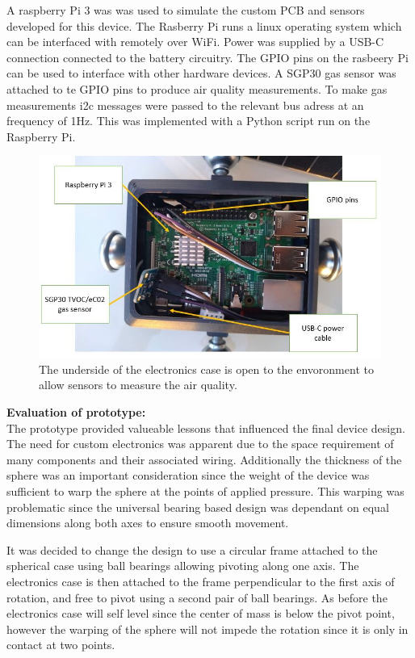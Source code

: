 A raspberry Pi 3 was was used to simulate the custom PCB and sensors developed for this device. The Rasberry Pi runs a linux operating system which can be interfaced with remotely over WiFi. Power was supplied by a USB-C connection connected to the battery circuitry. The GPIO pins on the rasbeery Pi can be used to interface with other hardware devices. A SGP30 gas sensor was attached to te GPIO pins to produce air quality measurements. To make gas measurements i2c messages were passed to the relevant bus adress at an frequency of 1Hz. This was implemented with a Python script run on the Raspberry Pi.

\begin{figure}[H]
\centering
\includegraphics[width=0.5\linewidth]{Engineering_hardware/Engineering_hardware_Figures/prototype_pic_2.JPG}
\caption{The underside of the electronics case is open to the envoronment to allow sensors to measure the air quality.}
\label{fig:15cm_shell_loading}
\end{figure}




\textbf{Evaluation of prototype:}\\
The prototype provided valueable lessons that influenced the final device design. The need for custom electronics was apparent due to the space requirement of many components and their associated wiring. Additionally the thickness of the sphere was an important consideration since the weight of the device was sufficient to warp the sphere at the points of applied pressure. This warping was problematic since the universal bearing based design was dependant on equal dimensions along both axes to ensure smooth movement.

It was decided to change the design to use a circular frame attached to the spherical case using ball bearings allowing pivoting along one axis. The electronics case is then attached to the frame perpendicular to the first axis of rotation, and free to pivot using a second pair of ball bearings. As before the electronics case will self level since the center of mass is below the pivot point, however the warping of the sphere will not impede the rotation since it is only in contact at two points.

